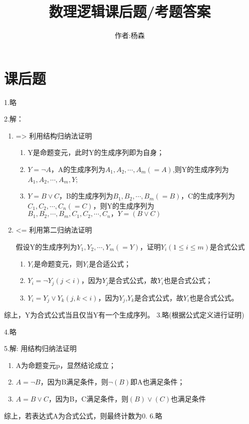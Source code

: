 \documentclass[a4paper]{ctexart}
\begin{document}
\title{数理逻辑课后题/考题答案}
\author{作者:杨森}
\maketitle
\newpage

\section{课后题}
\noindent 1.略

\noindent 2.解：
\begin{enumerate}
  \item =>
  利用结构归纳法证明
  \begin{enumerate}
    \item Y是命题变元，此时Y的生成序列即为自身；
    \item $Y=\neg A$，A的生成序列为$A_1,A_2,\cdots,A_m(=A)$,则Y的生成序列为$A_1,A_2,\cdots,A_m,Y$;
    \item $Y=B\vee C$，B的生成序列为$B_1,B_2,\cdots,B_m(=B)$，C的生成序列为$C_1,C_2,\cdots,C_n(=C)$，则Y的生成序列为$B_1,B_2,\cdots,B_m,C_1,C_2,\cdots,C_n，Y=(B\vee C)$
  \end{enumerate}
  
  \item <= 
  利用第二归纳法证明
  
  假设Y的生成序列为$Y_1,Y_2,\cdots,Y_m(=Y)$，证明$Y_i(1\leq i\leq m)$是合式公式
  \begin{enumerate}
    \item $Y_i$是命题变元，则$Y_i$是合适公式；
    \item $Y_i=\neg Y_j(j<i)$，因为$Y_j$是合式公式，故$Y_i$也是合式公式；
    \item $Y_i=Y_j \vee Y_k(j,k<i)$，因为$Y_j$,$Y_k$是合式公式，故$Y_i$也是合式公式。
  \end{enumerate}
\end{enumerate}
综上，Y为合式公式当且仅当Y有一个生成序列。\newline
\noindent 3.略(根据公式定义进行证明)

\noindent 4.略

\noindent 5.解:
用结构归纳法证明
\begin{enumerate}
  \item A为命题变元p，显然结论成立；
  \item $A=\neg B$，因为B满足条件，则$\neg (B)$即A也满足条件；
  \item $A=B\vee C$，因为B，C满足条件，则$(B)\vee (C)$也满足条件
\end{enumerate}
综上，若表达式A为合式公式，则最终计数为0.\newline
\noindent 6.略
\end{document}
